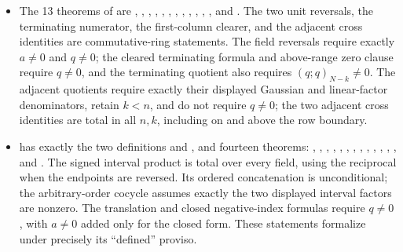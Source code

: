 \documentclass[11pt,a4paper,oneside,openany]{book}
\theoremstyle{definition}
\theoremstyle{remark}
\begin{document}
\begin{itemize}
\item The 13 theorems of
 are
,
,
,
,
,
,
,
,
,
,
,
, and
.  The two unit reversals,
the terminating numerator, the first-column clearer, and the adjacent cross
identities are commutative-ring statements.  The field reversals require
exactly \(a\ne0\) and \(q\ne0\); the cleared terminating formula and
above-range zero clause require \(q\ne0\), and the terminating quotient also
requires \((q;q)_{N-k}\ne0\).  The adjacent quotients require exactly their
displayed Gaussian and linear-factor denominators, retain \(k<n\), and do not
require \(q\ne0\); the two adjacent cross identities are total in all
\(n,k\), including on and above the row boundary.

\item {} has exactly the two definitions
 and , and fourteen
theorems:
,
,
,
,
,
,
,
,
,
,
,
,
, and
.  The signed interval product
is total over every field, using the reciprocal when the endpoints are
reversed.  Its ordered concatenation is unconditional; the arbitrary-order
cocycle assumes exactly the two displayed interval factors are nonzero.  The
translation and closed negative-index formulas require \(q\ne0\), with
\(a\ne0\) added only for the closed form.  These statements formalize
 under precisely its ``defined'' proviso.


\end{itemize}
\end{document}
